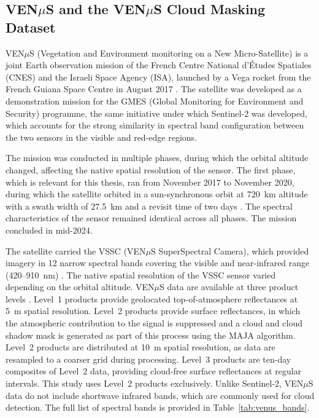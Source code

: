 \subsection{VEN$\mu$S and the VEN$\mu$S Cloud Masking Dataset}
\label{sec:dataset_venus}

VEN$\mu$S (Vegetation and Environment monitoring on a New Micro-Satellite) is a joint Earth observation mission of the French Centre National d'Études Spatiales (CNES) and the Israeli Space Agency (ISA), launched by a Vega rocket from the French Guiana Space Centre in August 2017 \cite{salvoldi2022}. The satellite was developed as a demonstration mission for the GMES (Global Monitoring for Environment and Security) programme, the same initiative under which Sentinel-2 was developed, which accounts for the strong similarity in spectral band configuration between the two sensors in the visible and red-edge regions.

The mission was conducted in multiple phases, during which the orbital altitude changed, affecting the native spatial resolution of the sensor. The first phase, which is relevant for this thesis, ran from November 2017 to November 2020, during which the satellite orbited in a sun-synchronous orbit at 720~km altitude with a swath width of 27.5~km and a revisit time of two days \cite{theia_venus}. The spectral characteristics of the sensor remained identical across all phases. The mission concluded in mid-2024.

The satellite carried the VSSC (VEN$\mu$S SuperSpectral Camera), which provided imagery in 12 narrow spectral bands covering the visible and near-infrared range (420--910~nm) \cite{salvoldi2022}. The native spatial resolution of the VSSC sensor varied depending on the orbital altitude. VEN$\mu$S data are available at three product levels \cite{theia_venus}. Level~1 products provide geolocated top-of-atmosphere reflectances at 5~m spatial resolution. Level~2 products provide surface reflectances, in which the atmospheric contribution to the signal is suppressed and a cloud and cloud shadow mask is generated as part of this process using the MAJA algorithm. Level~2 products are distributed at 10~m spatial resolution, as data are resampled to a coarser grid during processing. Level~3 products are ten-day composites of Level~2 data, providing cloud-free surface reflectances at regular intervals. This study uses Level~2 products exclusively. Unlike Sentinel-2, VEN$\mu$S data do not include shortwave infrared bands, which are commonly used for cloud detection. The full list of spectral bands is provided in Table~\ref{tab:venus_bands}.

